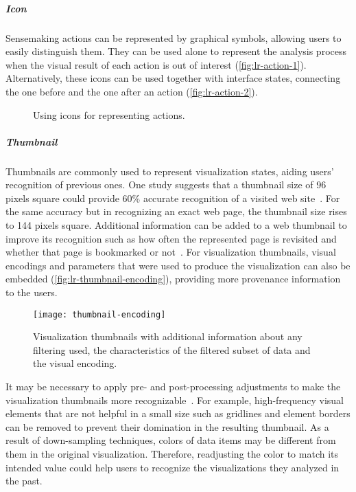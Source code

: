 \subparagraph{Icon}
Sensemaking actions can be represented by graphical symbols, allowing users to easily distinguish them. They can be used alone to represent the analysis process when the visual result of each action is out of interest (\autoref{fig:lr-action-1}). Alternatively, these icons can be used together with interface states, connecting the one before and the one after an action (\autoref{fig:lr-action-2}).

\begin{figure}[!htb]
\centering
{}

\vspace{.5\baselineskip}

\caption{Using icons for representing actions.}
\end{figure}


\subparagraph{Thumbnail}
Thumbnails are commonly used to represent visualization states, aiding users' recognition of previous ones. One study suggests that a thumbnail size of 96 pixels square could provide 60\% accurate recognition of a visited web site~\cite{Kaasten2001}. For the same accuracy but in recognizing an exact web page, the thumbnail size rises to 144 pixels square. Additional information can be added to a web thumbnail to improve its recognition such as how often the represented page is revisited and whether that page is bookmarked or not~\cite{Cockburn1999}. For visualization thumbnails, visual encodings and parameters that were used to produce the visualization can also be embedded (\autoref{fig:lr-thumbnail-encoding}), providing more provenance information to the users.

\begin{figure}[!htb]
	\centering
	\texttt{[image: thumbnail-encoding]}
	\caption{Visualization thumbnails with additional information about any filtering used, the characteristics of the filtered subset of data and the visual encoding. }
	\label{fig:lr-thumbnail-encoding}
\end{figure}

It may be necessary to apply pre- and post-processing adjustments to make the visualization thumbnails more recognizable~\cite{Heer2008}. For example, high-frequency visual elements that are not helpful in a small size such as gridlines and element borders can be removed to prevent their domination in the resulting thumbnail. As a result of down-sampling techniques, colors of data items may be different from them in the original visualization. Therefore, readjusting the color to match its intended value could help users to recognize the visualizations they analyzed in the past.

